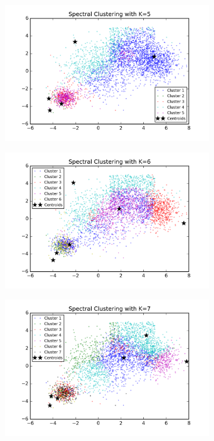 \begin{figure}[htb]
\begin{subfigure}[b]{0.475\textwidth}
            \includegraphics[width=\textwidth]{./figures/bigClustering_spectral_5.png}
        \end{subfigure}
        \hfill
        \begin{subfigure}[b]{0.475\textwidth}   
            \centering 
            \includegraphics[width=\textwidth]{./figures/bigClustering_spectral_6.png}
        \end{subfigure}
        \begin{subfigure}[b]{0.475\textwidth}   
            \centering 
            \includegraphics[width=\textwidth]{./figures/bigClustering_spectral_7.png}

\end{subfigure}
\end{figure}

